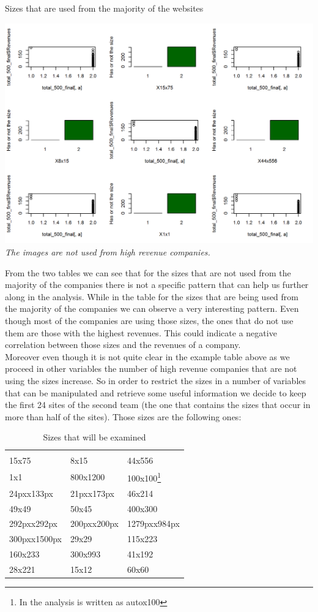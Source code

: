 \documentclass{book}
\begin{document}
\begin{table}[H]
\centering
\caption{Sizes that are used from the majority of the websites}
\begin{center}
\includegraphics[scale=0.5]{../R/photos/65_size_yes.png}    \\
\textit{The images are not used from high revenue companies.}
\end{center}
\end{table}
From the two tables we can see that for the sizes that are not used from the majority of the companies there is not a specific pattern that can help us further along in the analysis. While in the table for the sizes that are being used from the majority of the companies we can observe a very interesting pattern. Even though most of the companies are using those sizes, the ones that do not use them are those with the highest revenues. This could indicate a negative correlation between those sizes and the revenues of a company.\\
Moreover even though it is not quite clear in the example table above as we proceed in other variables the number of high revenue companies that are not using the sizes increase. So in order to restrict the sizes in a number of variables that can be manipulated and retrieve some useful information we decide to keep the first 24 sites of the second team (the one that contains the sizes that occur in more than half of the sites). Those sizes are the following ones:
\begin{table}[H]
\centering
\caption{Sizes that will be examined}
\begin{tabular}{lll}
\hline
 \\
15x75 
& 8x15
& 44x556 
\\1x1
& 800x1200
& 100x100\footnote{In the analysis is written as autox100}
\\24pxx133px
& 21pxx173px
& 46x214
\\49x49
& 50x45
& 400x300
\\292pxx292px
& 200pxx200px
& 1279pxx984px
\\300pxx1500px
& 29x29
& 115x223
\\160x233
& 300x993
& 41x192
\\28x221
& 15x12
& 60x60
\\ \hline
\end{tabular}
\end{table}
 
\end{document}
